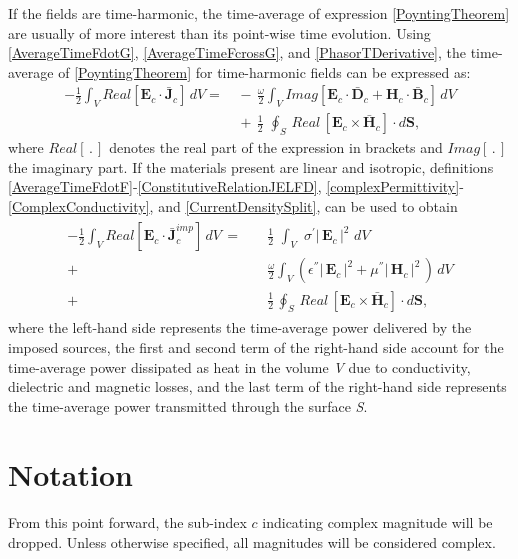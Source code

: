 If the fields are time-harmonic, the time-average of expression \eqref{PoyntingTheorem} are usually of more interest than its point-wise time evolution. Using \eqref{AverageTimeFdotG}, \eqref{AverageTimeFcrossG}, and \eqref{PhasorTDerivative}, the time-average of \eqref{PoyntingTheorem} for time-harmonic fields can be expressed as:
\begin{equation}\label{PoyntingTheoremFD}
	\begin{aligned}
		- \frac{1}{2} \int_{V} Real\left[\mathbf{E}_{c}\cdot\mathbf{\bar{J}}_{c}\right]\,dV = &\,-\,\frac{\omega}{2} \int_{V} Imag\left[\mathbf{E}_{c}\cdot\mathbf{\bar{D}}_{c} + \mathbf{H}_{c}\cdot\mathbf{\bar{B}}_{c}\right]\,dV
		\\
		&\,+\,\frac{1}{2}\,\,\oint_{S}\, Real\,\left[\mathbf{E}_{c}\times\mathbf{\bar{H}}_{c}\right]\cdot d\mathbf{S},
	\end{aligned}
\end{equation}
where $Real[\,.\,]$ denotes the real part of the expression in brackets and $Imag[\,.\,]$ the imaginary part. If the materials present are linear and isotropic, definitions \eqref{AverageTimeFdotF}-\eqref{ConstitutiveRelationJELFD}, \eqref{complexPermittivity}-\eqref{ComplexConductivity}, and \eqref{CurrentDensitySplit}, can be used to obtain
\begin{eqnarray}\label{PoyntingTheoremFDLI}
	\begin{aligned}
		- \frac{1}{2} \int_{V} Real\left[\mathbf{E}_{c}\cdot\mathbf{\bar{J}}_{c}^{imp}\right]\,dV \,=\quad&\frac{1}{2}\,\,\int_{V}\,\,\sigma^{'} |\,\mathbf{E}_{c}\,|^{2}\,\,dV
		\\
		+\,&\frac{\omega}{2} \int_{V} \left(\epsilon^{''}|\,\mathbf{E}_{c}\,|^{2} + \mu^{''}|\,\mathbf{H}_{c}\,|^{2}\,\right)\,dV
		\\
		+\,&\frac{1}{2}\,\oint_{S}\, Real\,\left[\mathbf{E}_{c}\times\mathbf{\bar{H}}_{c}\right]\cdot d\mathbf{S},
	\end{aligned}
\end{eqnarray}
where the left-hand side represents the time-average power delivered by the imposed sources, the first and second term of the right-hand side account for the time-average power dissipated as heat in the volume \emph{V} due to conductivity, dielectric and magnetic losses, and the last term of the right-hand side represents the time-average power transmitted through the surface \emph{S}.

\section{Notation}

From this point forward, the sub-index $c$ indicating complex magnitude will be dropped. Unless otherwise specified, all magnitudes will be considered complex.

